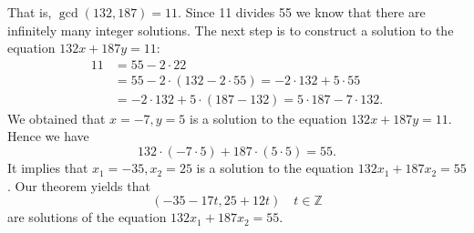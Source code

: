 That is, $\gcd(132,187)=11$. Since 11 divides 55 we know that there are infinitely many integer solutions.
The next step is to construct a solution to the equation $132x+187y=11:$
\begin{align*}
11&= 55-2\cdot 22\\
  &= 55-2\cdot (132-2\cdot 55)=-2\cdot 132+5\cdot 55\\
  &= -2\cdot 132+5\cdot (187-132)=5\cdot 187-7\cdot 132.
\end{align*}
We obtained that $x=-7, y=5$ is a solution to the equation $132x+187y=11$.
Hence we have
$$
132\cdot (-7\cdot 5)+187\cdot (5\cdot 5)=55.
$$
It implies that $x_1=-35,x_2=25$ is a solution to the equation $132x_1+187x_2=55$. Our theorem yields that
$$
\left(-35-17t, 25+12t\right)\quad t\in\mathbb{Z}
$$
are solutions of the equation $132x_1+187x_2=55$.

